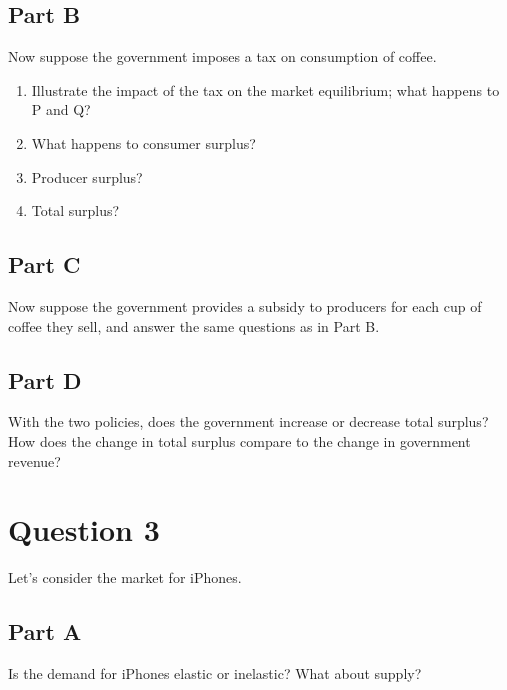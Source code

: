 \documentclass[12pt]{article}
\begin{document}
\vspace{2mm}

\subsection*{Part B}
Now suppose the government imposes a tax on consumption of coffee.

\vspace{2mm}

\begin{enumerate}
    \item Illustrate the impact of the tax on the market equilibrium; what happens to P and Q?
    \item What happens to consumer surplus?
    \item Producer surplus?
    \item Total surplus?
\end{enumerate}

\vspace{2mm}

\subsection*{Part C}
Now suppose the government provides a subsidy to producers for each cup of coffee they sell, and answer the same questions as in Part B.

\vspace{2mm}

\subsection*{Part D}
With the two policies, does the government increase or decrease total surplus? How does the change in total surplus compare to the change in government revenue?

\vspace{2mm}

\section*{Question 3}
Let's consider the market for iPhones.

\subsection*{Part A}

Is the demand for iPhones elastic or inelastic? What about supply?
\end{document}
